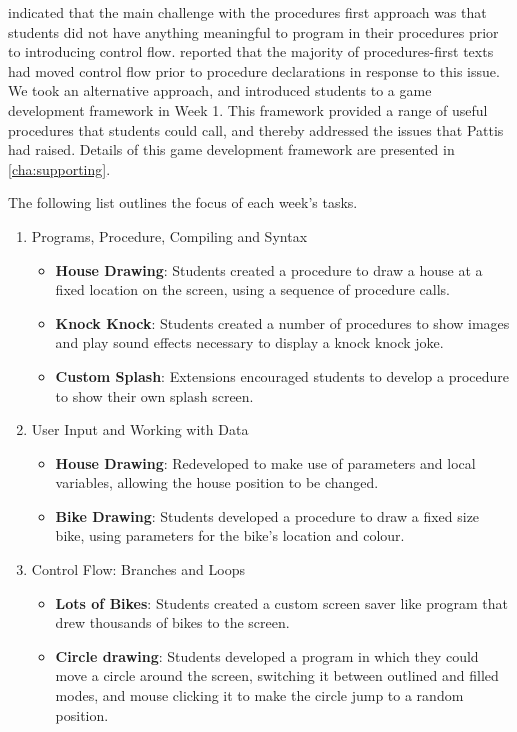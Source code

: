 \citet{Pattis:1990,Pattis:1993} indicated that the main challenge with the procedures first approach was that students did not have anything meaningful to program in their procedures prior to introducing control flow. \citet{Pattis:1993} reported that the majority of procedures-first texts had moved control flow prior to procedure declarations in response to this issue. We took an alternative approach, and introduced students to a game development framework in Week 1. This framework provided a range of useful procedures that students could call, and thereby addressed the issues that Pattis had raised. Details of this game development framework are presented in \cref{cha:supporting}.

The following list outlines the focus of each week's tasks.
\begin{enumerate}
  \item Programs, Procedure, Compiling and Syntax
  \begin{itemize}[noitemsep,nolistsep]
  	\item \textbf{House Drawing}: Students created a procedure to draw a house at a fixed location on the screen, using a sequence of procedure calls. 
  	\item \textbf{Knock Knock}: Students created a number of procedures to show images and play sound effects necessary to display a knock knock joke.
  	\item \textbf{Custom Splash}: Extensions encouraged students to develop a procedure to show their own splash screen.
  \end{itemize}
  \item User Input and Working with Data
  \begin{itemize}[noitemsep,nolistsep]
  	\item \textbf{House Drawing}: Redeveloped to make use of parameters and local variables, allowing the house position to be changed.
  	\item \textbf{Bike Drawing}: Students developed a procedure to draw a fixed size bike, using parameters for the bike's location and colour.
  \end{itemize}
  \item Control Flow: Branches and Loops
  \begin{itemize}[noitemsep,nolistsep]
  	\item \textbf{Lots of Bikes}: Students created a custom screen saver like program that drew thousands of bikes to the screen.
  	\item \textbf{Circle drawing}: Students developed a program in which they could move a circle around the screen, switching it between outlined and filled modes, and mouse clicking it to make the circle jump to a random position.

\end{itemize}
\end{enumerate}
